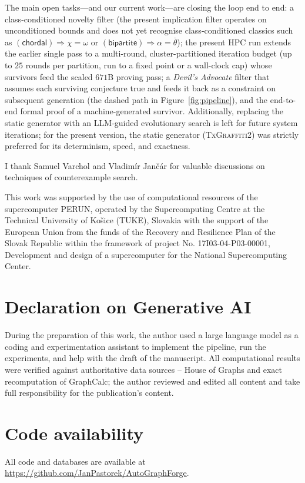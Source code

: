 \documentclass[]{ceurart}
\begin{document}
The main open tasks---and our current work---are closing the loop end to end: a class-conditioned
novelty filter (the present implication filter operates on unconditioned bounds and does not yet
recognise class-conditioned classics such as $(\textsf{chordal})\Rightarrow\chi=\omega$ or
$(\textsf{bipartite})\Rightarrow\alpha=\overline{\theta}$); the present HPC run extends the earlier
single pass to a multi-round, cluster-partitioned iteration budget (up to $25$ rounds per partition, run to a
fixed point or a wall-clock cap) whose survivors feed the scaled $671$B proving pass; a \emph{Devil's
Advocate} filter that
assumes each surviving conjecture true and feeds it back as a constraint on subsequent generation
(the dashed path in Figure~\ref{fig:pipeline}), and the end-to-end formal proof of a
machine-generated survivor. Additionally, replacing the static generator with an LLM-guided evolutionary search is left for future system iterations; for the present version, the static generator (\textsc{TxGraffiti2}) was strictly preferred for its determinism, speed, and exactness.

\begin{acknowledgments}
  I thank Samuel Varchol and Vladimír Jančár for valuable discussions on techniques of counterexample search. 

  This work was supported by the use of computational resources of the supercomputer PERUN, operated by the Supercomputing Centre at the Technical University of Košice (TUKE), Slovakia with the support of the European Union from the funds of the Recovery and Resilience Plan of the Slovak Republic within the framework of project No. 17I03-04-P03-00001, Development and design of a supercomputer for the National Supercomputing Center.
\end{acknowledgments}

\section*{Declaration on Generative AI}
During the preparation of this work, the author used a large language model
as a coding and experimentation assistant to implement the pipeline, run the
experiments, and help with the draft of the manuscript. All computational results were verified against authoritative data sources -- House of Graphs and exact recomputation of GraphCalc; the
author reviewed and edited all content and take full responsibility for the
publication's content.

\section*{Code availability}
All code and databases are available at \url{https://github.com/JanPastorek/AutoGraphForge}.
\end{document}
